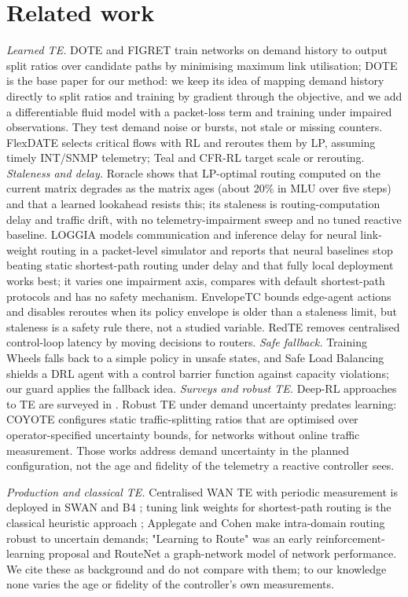\documentclass[journal]{IEEEtran}
\begin{document}
\section{Related work}
\label{sec:2}
\textit{Learned TE.} DOTE \cite{r1} and FIGRET \cite{r2} train networks on demand history to output split ratios over candidate paths by minimising maximum link utilisation; DOTE is the base paper for our method: we keep its idea of mapping demand history directly to split ratios and training by gradient through the objective, and we add a differentiable fluid model with a packet-loss term and training under impaired observations. They test demand noise or bursts, not stale or missing counters. FlexDATE \cite{r3} selects critical flows with RL and reroutes them by LP, assuming timely INT/SNMP telemetry; Teal \cite{r4} and CFR-RL \cite{r5} target scale or rerouting. \textit{Staleness and delay.} Roracle \cite{r6} shows that LP-optimal routing computed on the current matrix degrades as the matrix ages (about 20\% in MLU over five steps) and that a learned lookahead resists this; its staleness is routing-computation delay and traffic drift, with no telemetry-impairment sweep and no tuned reactive baseline. LOGGIA \cite{r7} models communication and inference delay for neural link-weight routing in a packet-level simulator and reports that neural baselines stop beating static shortest-path routing under delay and that fully local deployment works best; it varies one impairment axis, compares with default shortest-path protocols and has no safety mechanism. EnvelopeTC \cite{r8} bounds edge-agent actions and disables reroutes when its policy envelope is older than a staleness limit, but staleness is a safety rule there, not a studied variable. RedTE \cite{r9} removes centralised control-loop latency by moving decisions to routers. \textit{Safe fallback.} Training Wheels \cite{r10} falls back to a simple policy in unsafe states, and Safe Load Balancing \cite{r11} shields a DRL agent with a control barrier function against capacity violations; our guard applies the fallback idea. \textit{Surveys and robust TE.} Deep-RL approaches to TE are surveyed in \cite{r12}. Robust TE under demand uncertainty predates learning: COYOTE \cite{r13} configures static traffic-splitting ratios that are optimised over operator-specified uncertainty bounds, for networks without online traffic measurement. Those works address demand uncertainty in the planned configuration, not the age and fidelity of the telemetry a reactive controller sees.

\textit{Production and classical TE.} Centralised WAN TE with periodic measurement is deployed in SWAN \cite{r14} and B4 \cite{r15}; tuning link weights for shortest-path routing is the classical heuristic approach \cite{r16}; Applegate and Cohen \cite{r17} make intra-domain routing robust to uncertain demands; "Learning to Route" \cite{r18} was an early reinforcement-learning proposal and RouteNet \cite{r19} a graph-network model of network performance. We cite these as background and do not compare with them; to our knowledge none varies the age or fidelity of the controller's own measurements.
\end{document}
